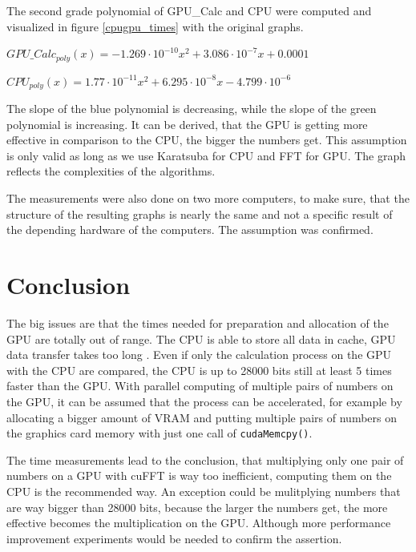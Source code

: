 \documentclass[12pt,a4paper]{article}
\begin{document}
The second grade polynomial of GPU\_Calc and CPU were computed and visualized in figure \ref{cpugpu_times} with the original graphs.
 
\begin{center}
    $GPU\_Calc_{poly}(x) = -1.269 \cdot 10^{-10}x^2 + 3.086 \cdot 10^{-7}x + 0.0001$
\end{center}

\begin{center}
    $CPU_{poly}(x) = 1.77 \cdot 10^{-11}x^2 + 6.295 \cdot 10^{-8}x - 4.799 \cdot 10^{-6}$
\end{center}

The slope of the blue polynomial is decreasing, while the slope of the green polynomial is increasing. It can be derived, that the GPU is getting more effective in comparison to the CPU, the bigger the numbers get. This assumption is only valid as long as we use Karatsuba for CPU and FFT for GPU. The graph reflects the complexities of the algorithms.

The measurements were also done on two more computers, to make sure, that the structure of the resulting graphs is nearly the same and not a specific result of the depending hardware of the computers. The assumption was confirmed.

\section{Conclusion}
The big issues are that the times needed for preparation and allocation of the GPU are totally out of range. The CPU is able to store all data in cache, GPU data transfer takes too long \cite{cooper2011gpu}. Even if only the calculation process on the GPU with the CPU are compared, the CPU is up to 28000 bits still at least 5 times faster than the GPU. With parallel computing of multiple pairs of numbers on the GPU, it can be assumed that the process can be accelerated, for example by allocating a bigger amount of VRAM and putting multiple pairs of numbers on the graphics card memory with just one call of \texttt{cudaMemcpy()}.

The time measurements lead to the conclusion, that multiplying only one pair of numbers on a GPU with cuFFT is way too inefficient, computing them on the CPU is the recommended way. An exception could be mulitplying numbers that are way bigger than 28000 bits, because the larger the numbers get, the more effective becomes the multiplication on the GPU. Although more performance improvement experiments would be needed to confirm the assertion.


\end{document}
